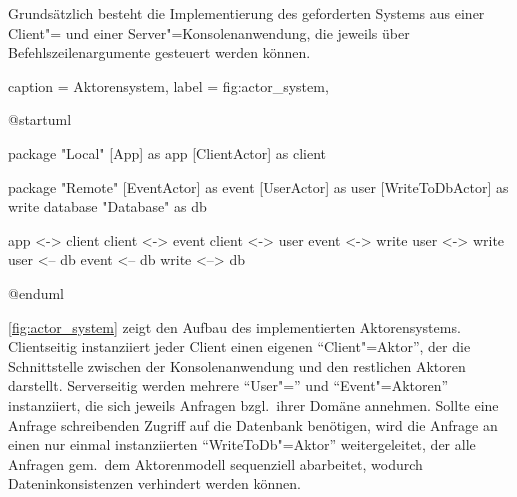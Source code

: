 Grundsätzlich besteht die Implementierung des geforderten Systems aus einer Client"= und einer Server"=Konsolenanwendung, die jeweils über Befehlszeilenargumente gesteuert werden können.

\begin{dhbwfigure}{%
    caption	= Aktorensystem,
    label	= fig:actor_system,
}
\begin{plantuml}
@startuml

package "Local" {
    [App] as app
    [ClientActor] as client
}

package "Remote" {
    [EventActor] as event
    [UserActor] as user
    [WriteToDbActor] as write
    database "Database" as db
}

app <-> client
client <-> event
client <-> user
event <-> write
user <-> write
user <-- db
event <-- db
write <--> db

@enduml
\end{plantuml}
\end{dhbwfigure}

\autoref{fig:actor_system} zeigt den Aufbau des implementierten Aktorensystems.
Clientseitig instanziiert jeder Client einen eigenen \enquote{Client"=Aktor}, der die Schnittstelle zwischen der Konsolenanwendung und den restlichen Aktoren darstellt.
Serverseitig werden mehrere \enquote{User"=} und \enquote{Event"=Aktoren} instanziiert, die sich jeweils Anfragen bzgl.\ ihrer Domäne annehmen.
Sollte eine Anfrage schreibenden Zugriff auf die Datenbank benötigen, wird die Anfrage an einen nur einmal instanziierten \enquote{WriteToDb"=Aktor} weitergeleitet, der alle Anfragen gem.\ dem Aktorenmodell sequenziell abarbeitet, wodurch Dateninkonsistenzen verhindert werden können.
